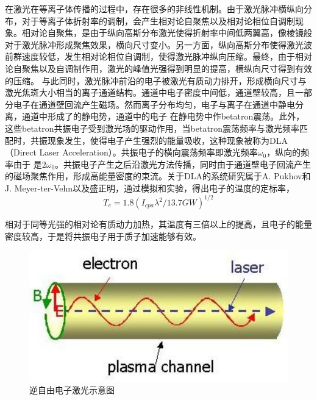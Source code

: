 在激光在等离子体传播的过程中，存在很多的非线性机制。由于激光脉冲横纵向分布，对于等离子体折射率的调制，会产生相对论自聚焦以及相对论相位自调制现象。相对论自聚焦，是由于纵向高斯分布激光使得折射率中间低两翼高，像棱镜般对于激光脉冲形成聚焦效果，横向尺寸变小。另一方面，纵向高斯分布使得激光波前群速度较低，发生相对论相位自调制，使得激光脉冲纵向压缩。最终，由于相对论自聚焦以及自调制作用，激光的峰值光强得到明显的提高，横纵向尺寸得到有效的压缩\cite{wang2011laser}。
与此同时，激光脉冲前沿的电子被激光有质动力排开，形成横向尺寸与激光焦斑大小相当的离子通道结构。通道中电子密度中间低，通道壁较高，且一部分电子在通道壁回流产生磁场。然而离子分布均匀，电子与离子在通道中静电分离，通道中形成了的静电势，通道中的电子  在静电势中作betatron震荡。此外，这些betatron共振电子受到激光场的驱动作用，当betatron震荡频率与激光频率匹配时，共振现象发生，使得电子产生强烈的能量吸收，这种现象被称为DLA（Direct Laser Acceleration）。共振电子的横向震荡频率即激光频率$\omega_0$，纵向的频率由于  是$2 \omega_0$。共振电子产生之后沿激光方法传播，同时由于通道壁电子回流产生的磁场聚焦作用，形成高能量密度的束流。关于DLA的系统研究属于A. Pukhov和J. Meyer-ter-Vehn以及盛正明\cite{pukhov1998relativistic,pukhov1999particle}，通过模拟和实验，得出电子的温度的定标率，
\begin{equation}
\label{eqn:DLAtemperature}
T_e = 1.8(I_{cpa} {\lambda}^2/{13.7}GW)^{1/2}
\end{equation} 

相对于同等光强的相对论有质动力加热，其温度有三倍以上的提高，且电子的能量密度较高，于是将共振电子用于质子加速能够有效。

\begin{figure}[!htbp]
  \centering
  \includegraphics[width=\MyFactor\textwidth]{Img/IFEL.eps}
  \caption{逆自由电子激光示意图}
  \label{fig:IFEL}
\end{figure}

